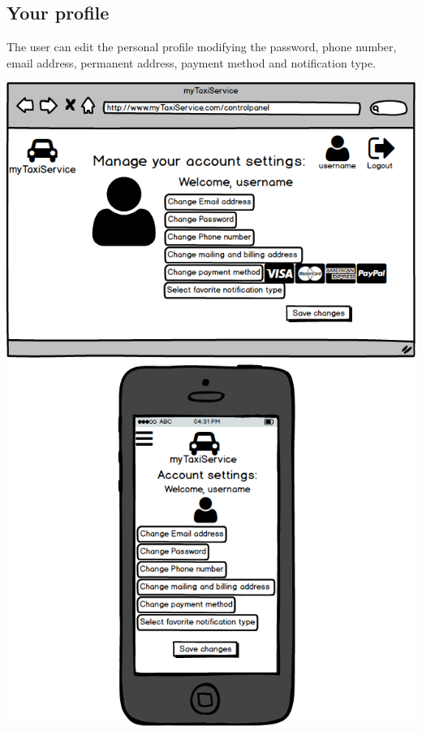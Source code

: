 \documentclass[a4paper,11pt]{report} %
\begin{document}
	\subsection{Your profile} The user can edit the personal profile modifying the password, phone number, email address, permanent address, payment method and notification type.
	\begin{center}
		\includegraphics[width=0.9\linewidth]{Pictures/AccountPage}
	\end{center}
	\pagebreak
	
\end{document}
